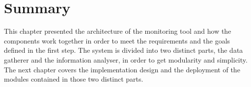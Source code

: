 \section{Summary}
This chapter presented the architecture of the monitoring tool and how the components work together in order to meet the requirements and the goals defined in the first step. The system is divided into two distinct parts, the data gatherer and the information analyser, in order to get modularity and simplicity. The next chapter covers the implementation design and the deployment of the modules contained in those two distinct parts.




